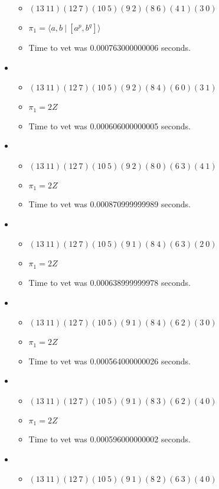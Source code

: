 \documentclass{article}
\begin{document}
\begin{itemize}
\begin{itemize}
      \item $(13\ 11)(12\ 7)(10\ 5)(9\ 2)(8\ 6)(4\ 1)(3\ 0)$
      \item $\pi_1 = \langle a,b\ |\ [a^p,b^q]\rangle$
      \item Time to vet was 0.000763000000006 seconds.
\end{itemize}
\item \begin{itemize}
      \item $(13\ 11)(12\ 7)(10\ 5)(9\ 2)(8\ 4)(6\ 0)(3\ 1)$
      \item $\pi_1 =2 Z$
      \item Time to vet was 0.000606000000005 seconds.
\end{itemize}
\item \begin{itemize}
      \item $(13\ 11)(12\ 7)(10\ 5)(9\ 2)(8\ 0)(6\ 3)(4\ 1)$
      \item $\pi_1 =2 Z$
      \item Time to vet was 0.000870999999989 seconds.
\end{itemize}
\item \begin{itemize}
      \item $(13\ 11)(12\ 7)(10\ 5)(9\ 1)(8\ 4)(6\ 3)(2\ 0)$
      \item $\pi_1 =2 Z$
      \item Time to vet was 0.000638999999978 seconds.
\end{itemize}
\item \begin{itemize}
      \item $(13\ 11)(12\ 7)(10\ 5)(9\ 1)(8\ 4)(6\ 2)(3\ 0)$
      \item $\pi_1 =2 Z$
      \item Time to vet was 0.000564000000026 seconds.
\end{itemize}
\item \begin{itemize}
      \item $(13\ 11)(12\ 7)(10\ 5)(9\ 1)(8\ 3)(6\ 2)(4\ 0)$
      \item $\pi_1 =2 Z$
      \item Time to vet was 0.000596000000002 seconds.
\end{itemize}
\item \begin{itemize}
      \item $(13\ 11)(12\ 7)(10\ 5)(9\ 1)(8\ 2)(6\ 3)(4\ 0)$

\end{itemize}
\end{itemize}
\end{document}
